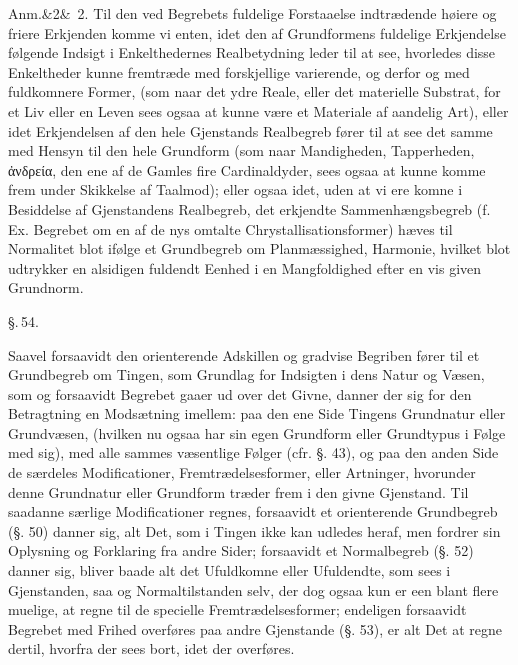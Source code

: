 \documentclass[12pt]{book}
\makeatletter
\def\sperr#1{#1}%
\def\textit#1{#1}%
\def\emph#1{#1}%
\newcommand{\sperr}[1]{\textls[180]{#1}}
\newcommand{\umph}[2][misc]{%
  \@ifundefined{umph@#1@on}{#2}{\emph{#2}}}
\newcommand{\parag}[1]{%
  \par\vspace{0.9\baselineskip}%
  {\centering\textit{\S.\,#1.}\par}%
  \vspace{0.35\baselineskip}%
  \noindent\hspace{\parindent}\ignorespaces
}
\newcommand{\anm}[1]{%
  \par\vspace{0.5\baselineskip}%
  \noindent\hspace{\parindent}\sperr{Anm.}\ifx&#1&\else~\textit{#1}.\fi
  \enspace\ignorespaces
}
\newcommand{\opage}[1]{\marginnote{\footnotesize\textit{[#1]}}}
\makeatother
\begin{document}
\anm{2} Til den ved Begrebets fuldelige Forstaaelse indtrædende høiere og friere
Erkjenden komme vi enten, idet den af Grundformens fuldelige Erkjendelse følgende Indsigt
i Enkelthedernes Realbetydning leder til at see, hvorledes disse Enkeltheder kunne
fremtræde med forskjellige varierende, og derfor og med fuldkomnere Former, (som naar det
ydre Reale, eller det materielle Substrat, for et Liv eller en Leven sees ogsaa at kunne
være et Materiale af aandelig Art), eller idet Erkjendelsen af den hele Gjenstands
Realbegreb fører til at see det samme med Hensyn til den hele Grundform (som
\opage{122} naar Mandigheden, Tapperheden, \textit{ἀνδρεία}, den ene af de Gamles fire
Cardinaldyder, sees ogsaa at kunne komme frem under Skikkelse af Taalmod); eller ogsaa
idet, uden at vi ere komne i Besiddelse af Gjenstandens Realbegreb, det erkjendte
Sammenhængsbegreb (f. Ex. Begrebet om en af de nys omtalte Chrystallisationsformer) hæves
til Normalitet blot ifølge et Grundbegreb om Planmæssighed, Harmonie, hvilket blot
udtrykker en alsidigen fuldendt Eenhed i en Mangfoldighed efter en vis given Grundnorm.

\parag{54}

Saavel forsaavidt den orienterende Adskillen og gradvise Begriben fører til et
Grundbegreb om Tingen, som Grundlag for Indsigten i dens Natur og Væsen, som og
forsaavidt Begrebet gaaer ud over det Givne, danner der sig for den \umph[schwab]{intellectuelle}
Betragtning en Modsætning imellem: paa den ene Side Tingens Grundnatur eller Grundvæsen,
(hvilken nu ogsaa har sin egen Grundform eller Grundtypus i Følge med sig), med alle
sammes væsentlige Følger (cfr. §. 43), og paa den anden Side de særdeles Modificationer,
Fremtrædelsesformer, eller Artninger, hvorunder denne Grundnatur eller Grundform træder
frem i den givne Gjenstand. Til saadanne særlige Modificationer regnes, forsaavidt et
orienterende Grundbegreb (§. 50) danner sig, alt Det, som i Tingen ikke kan udledes
heraf, men fordrer sin Oplysning og Forklaring fra andre Sider; forsaavidt et Normalbegreb
\opage{123} (§. 52) danner sig, bliver baade alt det Ufuldkomne eller Ufuldendte, som sees i
Gjenstanden, saa og Normaltilstanden selv, der dog ogsaa kun er een blant flere muelige,
at regne til de specielle Fremtrædelsesformer; endeligen forsaavidt Begrebet med Frihed
overføres paa andre Gjenstande (§. 53), er alt Det at regne dertil, hvorfra der sees bort,
idet der overføres.
\end{document}
